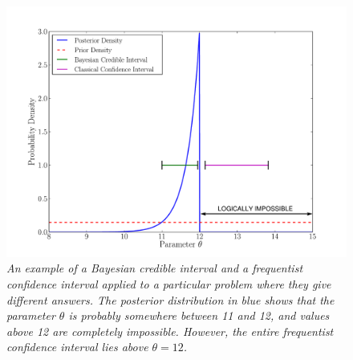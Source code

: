 \begin{figure}[ht!]
\begin{center}
\includegraphics[scale=0.5]{Figures/jaynes.pdf}
\caption{\it An example of a Bayesian credible interval and a frequentist confidence
interval applied to a particular problem where they give different answers.
The posterior distribution in blue shows that the parameter $\theta$ is probably
somewhere between 11 and 12, and values above 12 are completely impossible.
However, the entire frequentist confidence interval lies above $\theta=12$.
\label{fig:jaynes}}
\end{center}
\end{figure}

